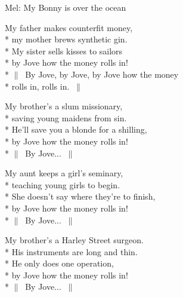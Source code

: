 \begin{SongText}
    \begin{SongInfo}
        Mel: My Bonny is over the ocean
    \end{SongInfo}
    \begin{SongVerse}
        My father makes counterfit money,\\*%
        my mother brews synthetic gin.\\*%
        My sister sells kisses to sailors\\*%
        by Jove how the money rolls in!\\*%
        $\|\:$ By Jove, by Jove, by Jove how the money\\*%
        rolls in, rolls in. $\:\|$
    \end{SongVerse}
    \begin{SongVerse}
        My brother’s a slum missionary,\\*%
        saving young maidens from sin.\\*%
        He’ll save you a blonde for a shilling,\\*%
        by Jove how the money rolls in!\\*%
        $\|\:$ By Jove... $\:\|$
    \end{SongVerse}
    \begin{SongVerse}
        My aunt keeps a girl’s seminary,\\*%
        teaching young girls to begin.\\*%
        She doesn’t say where they’re to finish,\\*%
        by Jove how the money rolls in!\\*%
        $\|\:$ By Jove... $\:\|$
    \end{SongVerse}
    \begin{SongVerse}
        My brother’s a Harley Street surgeon.\\*%
        His instruments are long and thin.\\*%
        He only does one operation,\\*%
        by Jove how the money rolls in!\\*%
        $\|\:$ By Jove... $\:\|$
    \end{SongVerse}
\end{SongText}